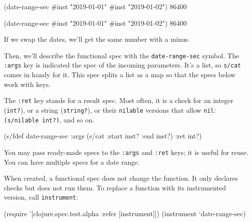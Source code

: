 \ifx\DEVICETYPE\MOBILE

\begin{english}
  \begin{clojure}
(date-range-sec #inst "2019-01-01"
                #inst "2019-01-02")
86400
  \end{clojure}
\end{english}

\else

\begin{english}
  \begin{clojure}
(date-range-sec #inst "2019-01-01" #inst "2019-01-02")
86400
  \end{clojure}
\end{english}

\fi

\noindent
If we swap the dates, we'll get the same number with a minus.

Then, we'll describe the functional spec with the \verb|date-range-sec| symbol. The \verb|:args| key is indicated the spec of the incoming parameters. It's a list, so \verb|s/cat| comes in handy for it. This spec splits a list as a map so that the specs below work with keys.

The \verb|:ret| key stands for a result spec. Most often, it is a check for an integer (\verb|int?|), or a string (\verb|string?|), or their \verb|nilable| versions that allow \verb|nil|: \verb|(s/nilable int?)|, and so on.


\begin{english}
  \begin{clojure}
(s/fdef date-range-sec
  :args (s/cat :start inst? :end inst?)
  :ret int?)
  \end{clojure}
\end{english}

You may pass ready-made specs to the \verb|:args| and \verb|:ret| keys; it is useful for reuse. You can have multiple specs for a date range.

When created, a functional spec does not change the function. It only declares checks but does not run them. To replace a function with its instrumented version, call \verb|instrument|:

\ifx\DEVICETYPE\MOBILE

\begin{english}
  \begin{clojure}
(require '[clojure.spec.test.alpha
           :refer [instrument]])
(instrument `date-range-sec)
  \end{clojure}
\end{english}


